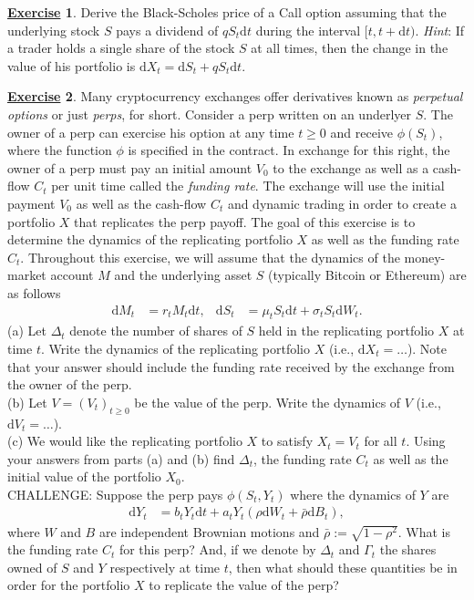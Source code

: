 \documentclass[12pt]{book}
\numberwithin{equation}{chapter}
\theoremstyle{plain}
\numberwithin{theorem}{section}
\theoremstyle{definition}
\newtheorem{exercise}{\underline{Exercise}}
\numberwithin{exercise}{chapter}
\newcommand{\<}{\langle}
\renewcommand{\>}{\rangle}
\renewcommand{\(}{\left(}
\renewcommand{\)}{\right)}
\renewcommand{\[}{\left[}
\renewcommand{\]}{\right]}
\newcommand\sig{\sigma}
\newcommand\Gam{\Gamma}
\newcommand\Del{\Delta}
\newcommand\rhob{\bar{\rho}}
\newcommand\dd{\mathrm{d}}
\theoremstyle{definition}
\numberwithin{question}{section}
\begin{document}
\begin{exercise}
\label{exer:5-4}
Derive the Black-Scholes price of a Call option assuming that the underlying stock $S$ pays a dividend of $q S_t \dd t$ during the interval $[t, t+ \dd t)$.  \textit{Hint}: If a trader holds a single share of the stock $S$ at all times, then the change in the value of his portfolio is $\dd X_t = \dd S_t + q S_t \dd t$.
\end{exercise}

\begin{exercise}
\label{exer:5-5}
Many cryptocurrency exchanges offer derivatives known as \textit{perpetual options} or just \textit{perps}, for short.  Consider a perp written on an underlyer $S$.  The owner of a perp can exercise his option at any time $t \geq 0$ and receive $\phi(S_t)$, where the function $\phi$ is specified in the contract.  In exchange for this right, the owner of a perp must pay an initial amount $V_0$ to the exchange as well as a cash-flow $C_t$ per unit time called the \textit{funding rate}.  The exchange will use the initial payment $V_0$ as well as the cash-flow $C_t$ and dynamic trading in order to create a portfolio $X$ that replicates the perp payoff.  The goal of this exercise is to determine the dynamics of the replicating portfolio $X$ as well as the funding rate $C_t$.  Throughout this exercise, we will assume that the dynamics of the money-market account $M$ and the underlying asset $S$ (typically Bitcoin or Ethereum) are as follows
\begin{align}
\dd M_t
	&=	r_t M_t \dd t , &
\dd S_t
	&=	\mu_t S_t \dd t + \sig_t S_t \dd W_t .
\end{align}
(a) Let $\Del_t$ denote the number of shares of $S$ held in the replicating portfolio $X$ at time $t$.  Write the dynamics of the replicating portfolio $X$ (i.e., $\dd X_t = \ldots$).  Note that your answer should include the funding rate received by the exchange from the owner of the perp.\\
(b) Let $V = (V_t)_{t \geq 0}$ be the value of the perp.  Write the dynamics of $V$ (i.e., $\dd V_t = \ldots$).\\
(c) We would like the replicating portfolio $X$ to satisfy $X_t = V_t$ for all $t$.  Using your answers from parts (a) and (b) find $\Del_t$, the funding rate $C_t$ as well as the initial value of the portfolio $X_0$.\\
CHALLENGE: Suppose the perp pays $\phi(S_t,Y_t)$ where the dynamics of $Y$ are
\begin{align}
\dd Y_t
	&=	b_t Y_t \dd t + a_t Y_t ( \rho \dd W_t + \rhob \dd B_t ) ,
\end{align}
where $W$ and $B$ are independent Brownian motions and $\rhob := \sqrt{1-\rho^2}$.  What is the funding rate $C_t$ for this perp?  And, if we denote by $\Del_t$ and $\Gam_t$ the shares owned of $S$ and $Y$ respectively at time $t$, then what should these quantities be in order for the portfolio $X$ to replicate the value of the perp?
\end{exercise}
\end{document}
